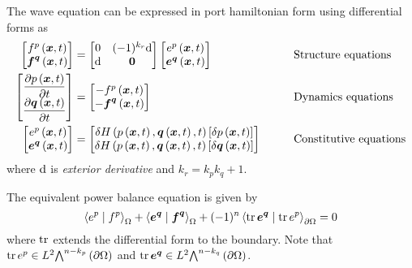The wave equation can be expressed in port hamiltonian form using differential
forms as
\begin{equation}
  \begin{aligned}
    \begin{bmatrix}
       f^{p}\left(  \boldsymbol{x} ,t \right)  \\
        \boldsymbol{f} ^{ \boldsymbol{q} }\left(  \boldsymbol{x} ,t \right) 
    \end{bmatrix}&=\begin{bmatrix}
    0 & (-1)^{k_{r}}  \mathrm{d}   \\
      \mathrm{d}   &  \boldsymbol{0} 
    \end{bmatrix}\begin{bmatrix}
       e^{p}\left(  \boldsymbol{x} ,t \right)  \\
        \boldsymbol{e} ^{ \boldsymbol{q} }\left(  \boldsymbol{x} ,t \right) 
    \end{bmatrix}&\qquad&\text{Structure equations}\\
    \begin{bmatrix}
       \dfrac{\partial  p\left(  \boldsymbol{x} ,t \right) }{\partial t}  \\
       \dfrac{\partial   \boldsymbol{q} \left(  \boldsymbol{x} ,t \right) }{\partial t}       
    \end{bmatrix}&=\begin{bmatrix}
      - f^{p}\left(  \boldsymbol{x} ,{t} \right)  \\
      -  \boldsymbol{f} ^{ \boldsymbol{q} }\left(  \boldsymbol{x} ,{t} \right)  \\          
    \end{bmatrix}&\qquad&\text{Dynamics equations}\\
    \begin{bmatrix}
       e^{p}\left(  \boldsymbol{x} ,t \right) \\
        \boldsymbol{e} ^{ \boldsymbol{q} }\left(  \boldsymbol{x} ,t \right) \\
    \end{bmatrix}&=\begin{bmatrix}
       \delta     H \left(  p\left(  \boldsymbol{x} ,t \right) ,  \boldsymbol{q} \left(  \boldsymbol{x} ,t \right) ,t \right)  \left[   \delta   p\left(  \boldsymbol{x} ,t \right)   \right]  \\
       \delta     H \left(  p\left(  \boldsymbol{x} ,t \right) ,  \boldsymbol{q} \left(  \boldsymbol{x} ,t \right) ,t \right)  \left[   \delta    \boldsymbol{q} \left(  \boldsymbol{x} ,t \right)   \right]  
    \end{bmatrix}&\qquad&\text{Constitutive equations}
  \end{aligned}
\end{equation}
where $  \mathrm{d}  $ is \emph{exterior derivative} and $k_{r}=k_{p}k_{q}+1$.

The equivalent power balance equation is given by
\begin{equation}
  \dualityform{e^{p}}{f^{p}}{\Omega}+\dualityform{\vectr{e}^{\vectr{q}}}{\vectr{f}^{\vectr{q}}}{\Omega}+(-1)^{n}\dualityform{\trace{}{
  \covectr{e}^{\covectr{q}}}}{\trace{}{e^{p}}}{\boundary{\Omega}}=0
\end{equation}
where $\operatorname{tr}$ extends the differential form to the boundary. Note that
$\trace{}{e^{p}}\in\ltwodiffformspace{n-k_{p}}{\boundary{\Omega}}$ and
$\trace{}{\covectr{e}^{\covectr{q}}}\in\ltwodiffformspace{n-k_{q}}{\boundary{\Omega}}$.


